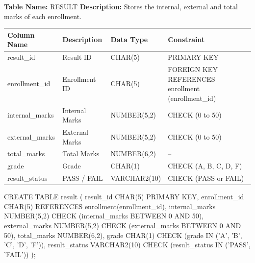 
\textbf{Table Name:} RESULT \hspace{1em plus 1fill}
\textbf{Description:} Stores the internal, external and total marks of each enrollment.

\vspace{8pt}

\renewcommand{\arraystretch}{1.4}
\begin{tabularx}{\textwidth}{|>{\raggedright\arraybackslash}X|>{\raggedright\arraybackslash}X|>{\raggedright\arraybackslash}X|>{\raggedright\arraybackslash}X|}
\hline
\textbf{Column Name} & \textbf{Description} & \textbf{Data Type} & \textbf{Constraint} \\
\hline
result\_id & Result ID & CHAR(5) & PRIMARY KEY \\
\hline
enrollment\_id & Enrollment ID & CHAR(5) & FOREIGN KEY REFERENCES enrollment (enrollment\_id) \\
\hline
internal\_marks & Internal Marks & NUMBER(5,2) & CHECK (0 to 50) \\
\hline
external\_marks & External Marks & NUMBER(5,2) & CHECK (0 to 50) \\
\hline
total\_marks & Total Marks & NUMBER(6,2) & -- \\
\hline
grade & Grade & CHAR(1) & CHECK (A, B, C, D, F) \\
\hline
result\_status & PASS / FAIL & VARCHAR2(10) & CHECK (PASS or FAIL) \\
\hline
\end{tabularx}

\vspace{14pt}


\begin{sqlcode}
CREATE TABLE result (
    result_id      CHAR(5)       PRIMARY KEY,
    enrollment_id  CHAR(5)       REFERENCES enrollment(enrollment_id),
    internal_marks NUMBER(5,2)   CHECK (internal_marks BETWEEN 0 AND 50),
    external_marks NUMBER(5,2)   CHECK (external_marks BETWEEN 0 AND 50),
    total_marks    NUMBER(6,2),
    grade          CHAR(1)
        CHECK (grade IN ('A', 'B', 'C', 'D', 'F')),
    result_status  VARCHAR2(10)  CHECK (result_status IN ('PASS', 'FAIL'))
);
\end{sqlcode}

\vspace{16pt}

